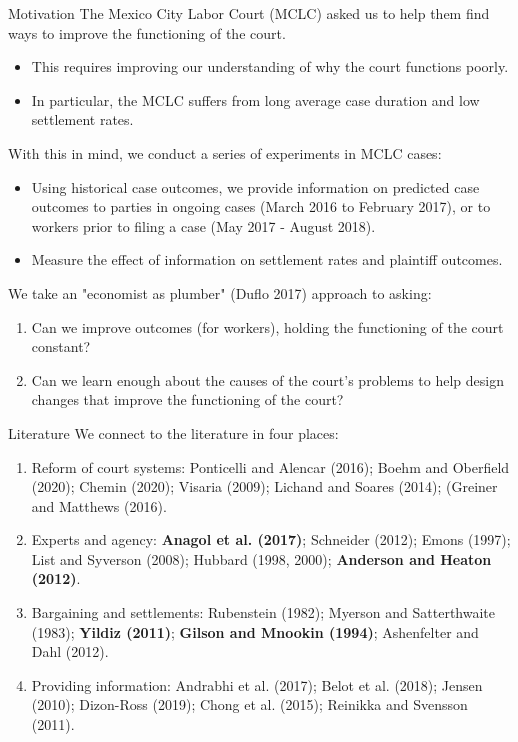 \documentclass[9pt]{beamer}
\begin{document}
 \begin{frame}{Motivation}{}
  The Mexico City Labor Court (MCLC) asked us to help them find ways to improve the functioning of the court. 
  \begin{itemize}
      \item This requires improving our understanding of why the court functions poorly.
      \item In particular, the MCLC suffers from long average case duration and low settlement rates.
  \end{itemize} 
  
  \vspace{2mm}
  \pause
  
    With this in mind, we conduct a series of experiments in MCLC cases:
    \begin{itemize}
        \item Using historical case outcomes, we provide information on predicted case outcomes to parties in ongoing cases (March 2016 to February 2017), or to workers prior to filing a case (May 2017 - August 2018).
        \item Measure the effect of information on settlement rates and plaintiff outcomes.
    \end{itemize}
\pause
\vspace{2mm}
We take an "economist as plumber" (Duflo 2017) approach to asking:
\begin{enumerate}
    \item Can we improve outcomes (for workers), holding the functioning of the court constant?
    \item Can we learn enough about the causes of the court's problems to help design changes that improve the functioning of the court?
\end{enumerate}

 \end{frame}

\begin{frame}{Literature}
We connect to the literature in four places:
\begin{enumerate}
    \item Reform of court systems: Ponticelli and Alencar (2016); Boehm and Oberfield (2020); Chemin (2020); Visaria (2009); Lichand and Soares (2014); (Greiner and Matthews (2016).
    \item Experts and agency: \textbf{Anagol et al. (2017)}; Schneider (2012); Emons (1997); List and Syverson (2008); Hubbard (1998, 2000); \textbf{Anderson and Heaton (2012)}.
    \item Bargaining and settlements: Rubenstein (1982); Myerson and Satterthwaite (1983); \textbf{Yildiz (2011)}; \textbf{Gilson and Mnookin (1994)}; Ashenfelter and Dahl (2012).
    \item Providing information: Andrabhi et al. (2017); Belot et al. (2018); Jensen (2010); Dizon-Ross (2019); Chong et al. (2015); Reinikka and Svensson (2011).

\end{enumerate}
    
\end{frame}
\end{document}
